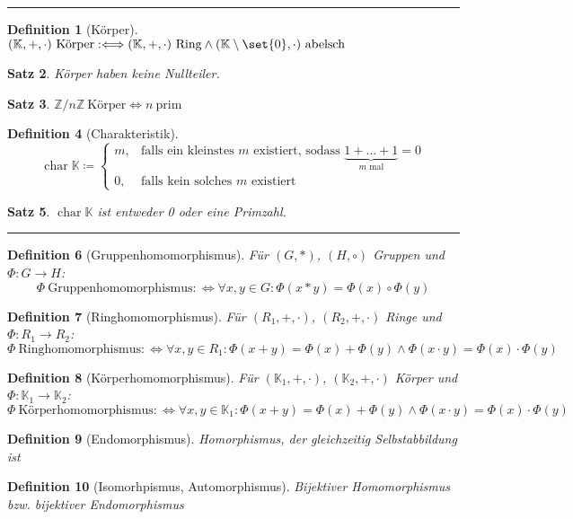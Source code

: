 \documentclass[a4paper]{article}
\newcounter{Sec}
\theoremstyle{marginbreak}
\newtheorem{definition}{Definition}[Sec]
\newtheorem{satz}[definition]{Satz}
\DeclareMathOperator{\chop}{char}
\newcommand{\sep}{%
	\rule{\textwidth}{0.3pt}%
	\stepcounter{Sec}%
	}
\begin{document}
	\sep
	\begin{definition}[Körper]
		$(\mathbb{K}, +, \cdot)~\text{Körper} :\Longleftrightarrow (\mathbb{K}, +, \cdot)~\text{Ring}
		\wedge (\mathbb{K}\setminus\set{0}, \cdot)~\text{abelsch}$
	\end{definition}
	\begin{satz}
		Körper haben keine Nullteiler.
	\end{satz}
	\begin{satz}
		$\mathbb{Z}/n\mathbb{Z}~\text{Körper} \iff n~\text{prim}$
	\end{satz}
	\begin{definition}[Charakteristik]
		\[\chop\mathbb{K} \coloneqq\begin{cases}
			m, &\text{falls ein kleinstes $m$ existiert, sodass $\underbrace{1 + \ldots + 1}_{\text{$m$ mal}} = 0$}\\
			0, & \text{falls kein solches $m$ existiert}
		\end{cases}\]
	\end{definition}
	\begin{satz}
		$\chop\mathbb{K}$ ist entweder 0 oder eine Primzahl.
	\end{satz}
	\sep
	\begin{definition}[Gruppenhomomorphismus]
		Für $(G, *)$, $(H, \circ)$ Gruppen und $\Phi\colon G \to H$:
		\[\Phi~\text{Gruppenhomomorphismus} :\Longleftrightarrow \forall x, y \in G: \Phi(x * y) = \Phi(x)\circ\Phi(y)\]
	\end{definition}
	\begin{definition}[Ringhomomorphismus]
		Für $(R_1, +, \cdot)$, $(R_2, +, \cdot)$ Ringe und $\Phi\colon R_1\to R_2$:
		\[\Phi~\text{Ringhomomorphismus} :\Longleftrightarrow \forall x, y \in R_1: \Phi(x + y) = \Phi(x) + \Phi(y) \wedge
		\Phi(x \cdot y) = \Phi(x) \cdot \Phi(y)\]
	\end{definition}
	\begin{definition}[Körperhomomorphismus]
		Für $(\mathbb{K}_1, +, \cdot)$, $(\mathbb{K}_2, +, \cdot)$ Körper und $\Phi\colon\mathbb{K}_1\to \mathbb{K}_2$:
		\[\Phi~\text{Körperhomomorphismus} :\Longleftrightarrow \forall x, y \in \mathbb{K}_1: \Phi(x + y) = \Phi(x) + \Phi(y) \wedge
		\Phi(x \cdot y) = \Phi(x) \cdot \Phi(y)\]
	\end{definition}
	\begin{definition}[Endomorphismus]
		Homorphismus, der gleichzeitig Selbstabbildung ist
	\end{definition}
	\begin{definition}[Isomorhpismus, Automorphismus]
		Bijektiver Homomorphismus bzw. bijektiver Endomorphismus
	\end{definition}
\end{document}
